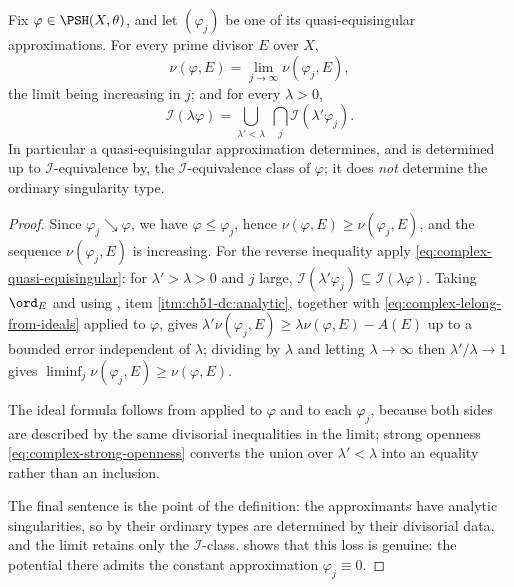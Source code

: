 \begin{proposition}\label{prop:ch51-qes-preserves-i}
Fix \(\varphi\in\PSH(X,\theta)\), and let \((\varphi_j)\) be one of its
quasi-equisingular approximations.  For every prime divisor \(E\) over \(X\),
\[
 \nu(\varphi,E)=\lim_{j\to\infty}\nu(\varphi_j,E),
\]
the limit being increasing in \(j\); and for every \(\lambda>0\),
\[
 \mathcal I(\lambda\varphi)
 =\bigcup_{\lambda'<\lambda}\ \bigcap_{j}\mathcal I(\lambda'\varphi_j).
\]
In particular a quasi-equisingular approximation determines, and is
determined up to \(\mathcal I\)-equivalence by, the
\(\mathcal I\)-equivalence class of \(\varphi\); it does \emph{not}
determine the ordinary singularity type.
\end{proposition}

\begin{proof}
Since \(\varphi_j\searrow\varphi\), we have \(\varphi\leq\varphi_j\),
hence \(\nu(\varphi,E)\geq\nu(\varphi_j,E)\), and the sequence
\(\nu(\varphi_j,E)\) is increasing.  For the reverse inequality apply
\eqref{eq:complex-quasi-equisingular}: for \(\lambda'>\lambda>0\) and
\(j\) large, \(\mathcal I(\lambda'\varphi_j)\subseteq
\mathcal I(\lambda\varphi)\).  Taking \(\ord_E\) and using
, item \cref{itm:ch51-dc:analytic},
together with \eqref{eq:complex-lelong-from-ideals} applied to
\(\varphi\), gives
\(\lambda'\nu(\varphi_j,E)\geq\lambda\nu(\varphi,E)-A(E)\) up to a bounded
error independent of \(\lambda\); dividing by \(\lambda\) and letting
\(\lambda\to\infty\) then \(\lambda'/\lambda\to1\) gives
\(\liminf_j\nu(\varphi_j,E)\geq\nu(\varphi,E)\).

The ideal formula follows from
 applied to \(\varphi\) and to each
\(\varphi_j\), because both sides are described by the same divisorial
inequalities in the limit; strong openness
\eqref{eq:complex-strong-openness} converts the union over
\(\lambda'<\lambda\) into an equality rather than an inclusion.

The final sentence is the point of the definition: the approximants have
analytic singularities, so by
 their ordinary types are determined by
their divisorial data, and the limit retains only the
\(\mathcal I\)-class.   shows that this loss is
genuine: the potential there admits the constant approximation
\(\varphi_j\equiv0\).
\end{proof}

